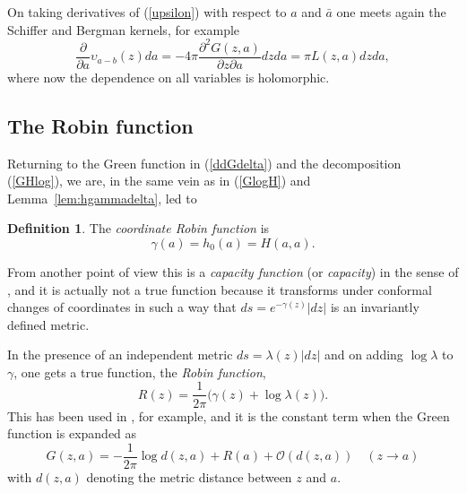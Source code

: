 \documentclass[reqno,12pt]{article}
\theoremstyle{plain}
\theoremstyle{definition}
\newtheorem{definition}{Definition}[section]
\numberwithin{equation}{section}
\numberwithin{figure}{section}
\begin{document}
On taking derivatives of (\ref{upsilon}) with respect to $a$ and $\bar{a}$ one meets again the Schiffer and Bergman kernels, for example
$$
\frac{\partial}{\partial a}\upsilon_{a-b}(z)da=-4\pi \frac{\partial^2 G(z,a)}{\partial z \partial a}dzda=\pi L(z,a)dzda,
$$
where now the dependence on all variables is holomorphic.
 

\subsection{The Robin function}\label{sec:Robin} 

Returning to the Green function in (\ref{ddGdelta}) and the decomposition (\ref{GHlog}),
we are, in the same vein as in (\ref{GlogH}) and Lemma~\ref{lem:hgammadelta}, 
led to 
\begin{definition}\label{def:coordinaterobin}
The {\it coordinate Robin function} is
$$
\gamma(a)=h_0(a)=H(a,a).
$$
\end{definition}
From another point of view this is a {\it capacity function} (or {\it capacity}) in the sense of \cite{Sario-Oikawa-1969}, 
and it is actually not a true function because it  transforms under conformal changes of coordinates in such a way that
$ds=e^{-\gamma(z)}|dz|$ is an invariantly defined metric. 

In the presence of an independent metric $ds=\lambda(z)|dz|$ and on adding $\log \lambda$ to $\gamma$,
one gets a true function,  the {\it Robin function},
\begin{equation}\label{Rh}
R(z)=\frac{1}{2\pi}\big(\gamma(z)+\log \lambda(z)\big).
\end{equation}
This has been used in  \cite{Koiller-Boatto-2009, Grotta-Ragazzo-Barros-Viglioni-2017, Grotta-Ragazzo-2024}, for example,
and it is the constant term when the Green function is expanded as
\begin{equation}\label{GlogdR}
G(z,a)=-\frac{1}{2\pi} \log d(z,a)+R(a)+ \mathcal{O}(d(z,a))\quad (z\to a)
\end{equation}
with $d(z,a)$ denoting the metric distance between $z$ and $a$.
\end{document}
